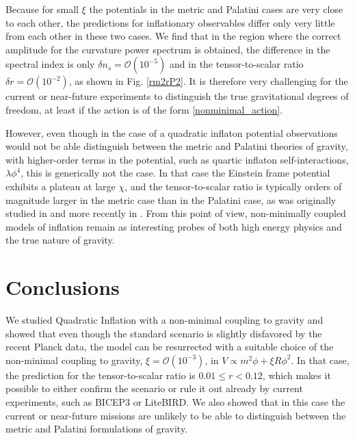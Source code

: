 \documentclass[11pt,a4paper]{article}
\begin{document}
Because for small $\xi$ the potentials in the metric and Palatini cases are very close to each other, the predictions for inflationary observables differ only very little from each other in these two cases. We find that in the region where the correct amplitude for the curvature power spectrum is obtained, the difference in the spectral index is only $\delta n_s = \mathcal{O}(10^{-5})$ and in the tensor-to-scalar ratio $\delta r = \mathcal{O}(10^{-2})$, as shown in Fig. \ref{rm2rP2}. It is therefore very challenging for the current or near-future experiments to distinguish the true gravitational degrees of freedom, at least if the action is of the form \eqref{nonminimal_action}.

However, even though in the case of a quadratic inflaton potential observations would not be able distinguish between the metric and Palatini theories of gravity, with higher-order terms in the potential, such as quartic inflaton self-interactions, $\lambda \phi^4$, this is generically not the case. In that case the Einstein frame potential exhibits a plateau at large $\chi$, and the tensor-to-scalar ratio is typically orders of magnitude larger in the metric case than in the Palatini case, as was originally studied in \cite{Bauer:2008zj} and more recently in \cite{Rasanen:2017ivk}. From this point of view, non-minimally coupled models of inflation remain as interesting probes of both high energy physics and the true nature of gravity.



\section{Conclusions}
\label{conclusions}

We studied Quadratic Inflation with a non-minimal coupling to gravity and showed that even though the standard scenario is slightly disfavored by the recent Planck data, the model can be resurrected with a suitable choice of the non-minimal coupling to gravity, $\xi=\mathcal{O}(10^{-3})$, in $V\propto m^2\phi + \xi R \phi^2$. In that case, the prediction for the tensor-to-scalar ratio is $0.01\leq r < 0.12$, which makes it possible to either confirm the scenario or rule it out already by current experiments, such as BICEP3 or LiteBIRD. We also showed that in this case the current or near-future missions are unlikely to be able to distinguish between the metric and Palatini formulations of gravity.
\end{document}
